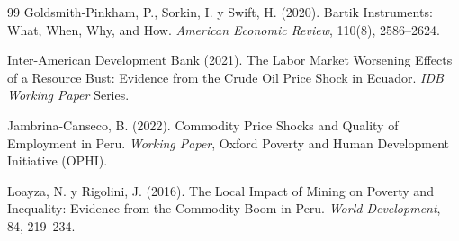 \documentclass[11pt]{article}
\begin{document}
\begin{thebibliography}{99}
Goldsmith-Pinkham, P., Sorkin, I. y Swift, H. (2020). Bartik Instruments: What, When, Why, and
How. \textit{American Economic Review}, 110(8), 2586--2624.

Inter-American Development Bank (2021). The Labor Market Worsening Effects of a Resource Bust:
Evidence from the Crude Oil Price Shock in Ecuador. \textit{IDB Working Paper} Series.

Jambrina-Canseco, B. (2022). Commodity Price Shocks and Quality of Employment in Peru.
\textit{Working Paper}, Oxford Poverty and Human Development Initiative (OPHI).

Loayza, N. y Rigolini, J. (2016). The Local Impact of Mining on Poverty and Inequality:
Evidence from the Commodity Boom in Peru. \textit{World Development}, 84, 219--234.

\end{thebibliography}
\end{document}
